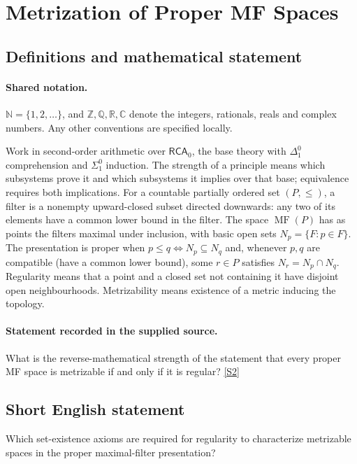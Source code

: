 \documentclass[11pt]{article}
\newcommand{\sref}[2]{\hyperlink{source:#1:#2}{[S#2]}}
\begin{document}
\section{Metrization of Proper MF Spaces}\label{statement}

\subsection{Definitions and mathematical statement}

\paragraph{Shared notation.}$\mathbb N=\{1,2,\ldots\}$, and $\mathbb Z,\mathbb Q,\mathbb R,\mathbb C$ denote the integers, rationals, reals and complex numbers. Any other conventions are specified locally.


Work in second-order arithmetic over $\mathsf{RCA}_0$, the base theory with $\Delta^0_1$ comprehension and $\Sigma^0_1$ induction. The strength of a principle means which subsystems prove it and which subsystems it implies over that base; equivalence requires both implications.  For a countable partially ordered set $(P,\leq)$, a filter is a nonempty upward-closed subset directed downwards: any two of its elements have a common lower bound in the filter. The space $\operatorname{MF}(P)$ has as points the filters maximal under inclusion, with basic open sets $N_p=\{F:p\in F\}$. The presentation is proper when $p\leq q\iff N_p\subseteq N_q$ and, whenever $p,q$ are compatible (have a common lower bound), some $r\in P$ satisfies $N_r=N_p\cap N_q$. Regularity means that a point and a closed set not containing it have disjoint open neighbourhoods. Metrizability means existence of a metric inducing the topology.
\paragraph{Statement recorded in the supplied source.}
What is the reverse-mathematical strength of the statement that every proper MF space is metrizable if and only if it is regular? \sref{statement}{2}
\subsection{Short English statement}
Which set-existence axioms are required for regularity to characterize metrizable spaces in the proper maximal-filter presentation?
\end{document}
